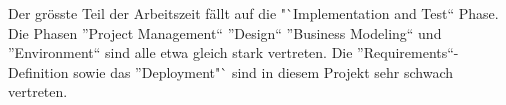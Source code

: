 \documentclass[10pt,a4paper]{scrartcl}
\begin{document}
Der grösste Teil der Arbeitszeit fällt auf die "`Implementation and Test"` Phase. Die Phasen
"'Project Management"` "'Design"` "'Business Modeling"` und "'Environment"` sind alle etwa gleich
stark vertreten. Die "'Requirements"`-Definition sowie das "'Deployment"` sind in diesem Projekt
sehr schwach vertreten.
\end{document}
